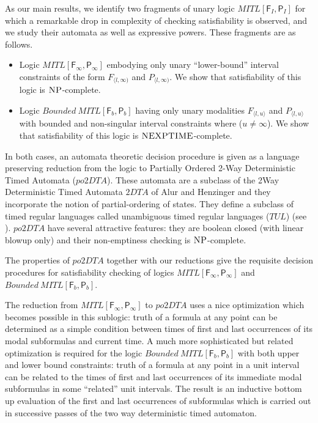 \documentclass{llncs}
\newcommand{\class}{\textsc}
\newcommand{\fut}{\textsf{F}}
\newcommand{\past}{\textsf{P}}
\newcommand{\oomit}[1]{}
\newcommand{\mitlfp}{\mbox{$\mathit{MITL[\fut_I,\past_I]}$}}
\newcommand{\bmitlfp}{\mbox{$\mathit{Bounded ~MITL[\fut_b,\past_b]}$}}
\newcommand{\potdta}{\mbox{$\mathit{po2DTA}$}}
\newcommand{\twodta}{\mbox{$\mathit{2DTA}$}}
\newcommand{\mitlfpinf}{\mbox{$\mathit{MITL[\fut_\infty,\past_\infty]}$}}
\newcommand{\mitlfpb}{\bmitlfp}
\newcommand{\nexptime}{\mbox{$\class{NEXPTIME}$}}
\newcommand{\conp}{\mbox{$\class{CoNP}$}}
\newcommand{\np}{\mbox{$\class{NP}$}}
\newcommand{\tul}{\mbox{$\mathit{TUL}$}}
\begin{document}
As our main results, we identify two fragments of unary logic $\mitlfp$ for which a remarkable drop in complexity of checking satisfiability is observed, and we study their automata as well as expressive powers. These fragments are as follows.
\begin{itemize} 
\item  Logic $\mitlfpinf$ embodying only unary ``lower-bound'' interval constraints of the form $F_{\langle l,\infty)}$ and $P_{\langle l,\infty)}$. We show that satisfiability of this logic is \np-complete.
\item Logic $\mitlfpb$ having only unary modalities $F_{\langle l,u\rangle}$ and $P_{\langle l,u\rangle}$ with bounded and non-singular interval constraints  where ($u \not= \infty$).
We show that satisfiability of this logic is \nexptime-complete.
\end{itemize}
In both cases, an automata theoretic decision procedure is given as a language preserving reduction from the logic  to  Partially Ordered 2-Way Deterministic Timed Automata (\potdta). These automata are a subclass of the 
2Way Deterministic Timed Automata $\twodta$ of Alur and Henzinger \cite{AH92} and they incorporate the notion of partial-ordering of states. 
They define a subclass of timed regular languages called unambiguous timed regular languages (\tul) (see \cite{PS10}).
\potdta\/ have several attractive features: they are boolean closed (with linear blowup only) and  their non-emptiness checking is \np-complete.
\oomit{ The
\potdta\/ have several attractive features: they are boolean closed and each boolean operation gives rise to linear blowup in their size.
Moreover,  their non-emptiness is NP-complete and language containment is \conp-complete  \cite{PS10}.
}
The  properties of \potdta\/ together with our reductions give the requisite decision procedures for satisfiability checking of logics \mitlfpinf\/ and \mitlfpb. \oomit{Both the reductions rely upon a novel scheme of  clocking (freezing) the times of first and last occurrences of subformulas in a pre-determined finite set of time intervals  to evaluate the truth of the formula. This can be done in  an inductive, bottom up fashion in successive passes of the two way automaton. 
}

The reduction from $\mitlfpinf$ to \potdta\/ uses a nice optimization which becomes possible in this sublogic: truth of a formula at any point can be determined as a simple condition between times of first and last occurrences of its modal subformulas and current time. A much more sophisticated but related optimization is required for the logic $\mitlfpb$ with both upper and lower bound constraints: truth of a formula at any point in a unit interval can be related to the times of first and last occurrences  of its immediate modal subformulas in some ``related'' unit intervals. The result is an inductive bottom up evaluation of the first and last occurrences of subformulas which is carried out in successive passes of the two way deterministic timed automaton.
\end{document}
